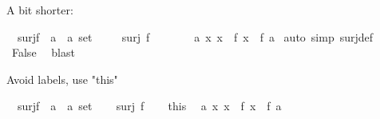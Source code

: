 \begin{isabellebody}
\begin{isamarkuptext}
A bit shorter:%
\end{isamarkuptext}\isamarkuptrue%
\isamarkupfalse%
\ {\isachardoublequoteopen}{\isasymnot}\ surj{\isacharparenleft}{\kern0pt}f\ {\isacharcolon}{\kern0pt}{\isacharcolon}{\kern0pt}\ {\isacharprime}{\kern0pt}a\ {\isasymRightarrow}\ {\isacharprime}{\kern0pt}a\ set{\isacharparenright}{\kern0pt}{\isachardoublequoteclose}\isanewline
%
\isadelimproof
%
\endisadelimproof
%
\isatagproof
{}\isamarkupfalse%
\isanewline
\ \ \isamarkupfalse%
\ {}{\isacharcolon}{\kern0pt}\ {\isachardoublequoteopen}surj\ f{\isachardoublequoteclose}\isanewline
\ \ \isamarkupfalse%
\ {}\ \isamarkupfalse%
\ {}{\isacharcolon}{\kern0pt}\ {\isachardoublequoteopen}{\isasymexists}a{\isachardot}{\kern0pt}\ {\isacharbraceleft}{\kern0pt}x{\isachardot}{\kern0pt}\ x\ {\isasymnotin}\ f\ x{\isacharbraceright}{\kern0pt}\ {\isacharequal}{\kern0pt}\ f\ a{\isachardoublequoteclose}\ \isamarkupfalse%
{\isacharparenleft}{\kern0pt}auto\ simp{\isacharcolon}{\kern0pt}\ surj{\isacharunderscore}{\kern0pt}def{\isacharparenright}{\kern0pt}\isanewline
\ \ \isamarkupfalse%
\ {}\ \isamarkupfalse%
\ {\isachardoublequoteopen}False{\isachardoublequoteclose}\ \isamarkupfalse%
\ blast\isanewline
{}\isamarkupfalse%
%
\endisatagproof
{\isafoldproof}%
%
\isadelimproof
%
\endisadelimproof
%
\isadelimdocument
%
\endisadelimdocument
%
\isatagdocument
%
\isamarkuptrue%
%
\endisatagdocument
{\isafolddocument}%
%
\isadelimdocument
%
\endisadelimdocument
%
\begin{isamarkuptext}%
Avoid labels, use "this"%
\end{isamarkuptext}\isamarkuptrue%
\isamarkupfalse%
\ {\isachardoublequoteopen}{\isasymnot}\ surj{\isacharparenleft}{\kern0pt}f\ {\isacharcolon}{\kern0pt}{\isacharcolon}{\kern0pt}\ {\isacharprime}{\kern0pt}a\ {\isasymRightarrow}\ {\isacharprime}{\kern0pt}a\ set{\isacharparenright}{\kern0pt}{\isachardoublequoteclose}\isanewline
%
\isadelimproof
%
\endisadelimproof
%
\isatagproof
{}\isamarkupfalse%
\isanewline
\ \ \isamarkupfalse%
\ {\isachardoublequoteopen}surj\ f{\isachardoublequoteclose}\isanewline
\ \ \isamarkupfalse%
\ this\ \isamarkupfalse%
\ {\isachardoublequoteopen}{\isasymexists}a{\isachardot}{\kern0pt}\ {\isacharbraceleft}{\kern0pt}x{\isachardot}{\kern0pt}\ x\ {\isasymnotin}\ f\ x{\isacharbraceright}{\kern0pt}\ {\isacharequal}{\kern0pt}\ f\ a{\isachardoublequoteclose}\ \isamarkupfalse%

\end{isabellebody}
